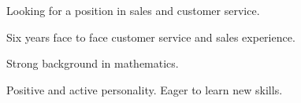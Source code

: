 

\begin{cventries}

  \cventry
    {} %
    {} %
    {} %
    {} %
    {
      \begin{cvitems} %
      \item Looking for a position in sales and customer service.
      \item Six years face to face customer service and sales experience.
      \item Strong background in mathematics.
      \item Positive and active personality.  Eager to learn new skills.
      \end{cvitems}
    }


\end{cventries}

